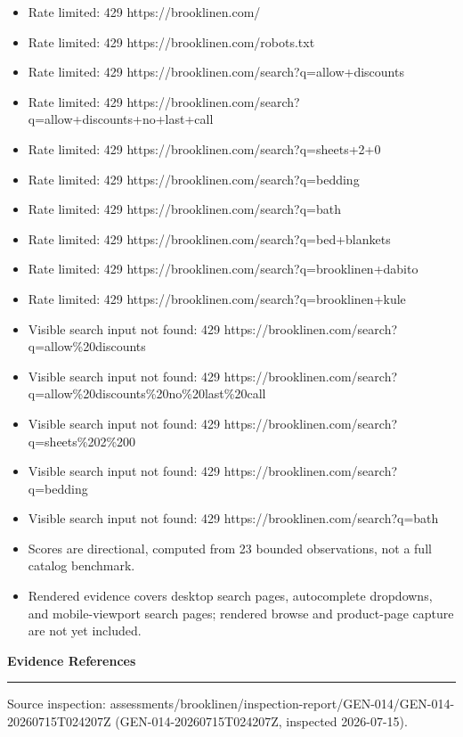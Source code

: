 \documentclass[10pt]{article}
\newcommand{\ReportSection}[1]{%
  \vspace{0.12in}
  {\fontsize{15}{18}\selectfont\bfseries\color{NVIInk}#1}\\[-0.02in]
  {\color{NVIAccent}\rule{\linewidth}{0.8pt}}
  \vspace{0.07in}
}
\newcommand{\ReportBody}[1]{{\fontsize{9.4}{11.5}\selectfont\color{NVIInk}#1}}
\newcommand{\ReportFine}[1]{{\fontsize{7.6}{9.1}\selectfont\color{NVIMuted}#1}}
\begin{document}
\begin{itemize}
\item \ReportBody{Rate limited: 429 https://brooklinen.com/}
\item \ReportBody{Rate limited: 429 https://brooklinen.com/robots.txt}
\item \ReportBody{Rate limited: 429 https://brooklinen.com/search?q=allow+discounts}
\item \ReportBody{Rate limited: 429 https://brooklinen.com/search?q=allow+discounts+no+last+call}
\item \ReportBody{Rate limited: 429 https://brooklinen.com/search?q=sheets+2+0}
\item \ReportBody{Rate limited: 429 https://brooklinen.com/search?q=bedding}
\item \ReportBody{Rate limited: 429 https://brooklinen.com/search?q=bath}
\item \ReportBody{Rate limited: 429 https://brooklinen.com/search?q=bed+blankets}
\item \ReportBody{Rate limited: 429 https://brooklinen.com/search?q=brooklinen+dabito}
\item \ReportBody{Rate limited: 429 https://brooklinen.com/search?q=brooklinen+kule}
\item \ReportBody{Visible search input not found: 429 https://brooklinen.com/search?q=allow\%20discounts}
\item \ReportBody{Visible search input not found: 429 https://brooklinen.com/search?q=allow\%20discounts\%20no\%20last\%20call}
\item \ReportBody{Visible search input not found: 429 https://brooklinen.com/search?q=sheets\%202\%200}
\item \ReportBody{Visible search input not found: 429 https://brooklinen.com/search?q=bedding}
\item \ReportBody{Visible search input not found: 429 https://brooklinen.com/search?q=bath}
\item \ReportBody{Scores are directional, computed from 23 bounded observations, not a full catalog benchmark.}
\item \ReportBody{Rendered evidence covers desktop search pages, autocomplete dropdowns, and mobile-viewport search pages; rendered browse and product-page capture are not yet included.}
\end{itemize}
\vspace{0.14in}
\ReportSection{Evidence References}
\ReportFine{Source inspection: assessments/brooklinen/inspection-report/GEN-014/GEN-014-20260715T024207Z (GEN-014-20260715T024207Z, inspected 2026-07-15).}\par
\end{document}
